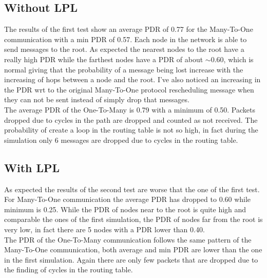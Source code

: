 \documentclass{article}
\begin{document}
\subsection{Without LPL}
The results of the first test show an average PDR of 0.77 for the Many-To-One communication with a min PDR of 0.57. Each node in the network is able to send messages to the root. As expected the nearest nodes to the root have a really high PDR while the farthest nodes have a PDR of about $\sim$0.60, which is normal giving that the probability of a message being lost increase with the increasing of hops between a node and the root. I've also noticed an increasing in the PDR wrt to the original Many-To-One protocol rescheduling message when they can not be sent instead of simply drop that messages.\\
The average PDR of the One-To-Many is 0.79 with a minimum of 0.50. Packets dropped due to cycles in the path are dropped and counted as not received. The probability of create a loop in the routing table is not so high, in fact during the simulation only 6 messages are dropped due to cycles in the routing table.\\
\subsection{With LPL}
As expected the results of the second test are worse that the one of the first test. For Many-To-One communication the average PDR has dropped to 0.60 while minimum is 0.25. While the PDR of nodes near to the root is quite high and comparable the ones of the first simulation, the PDR of nodes far from the root is very low, in fact there are 5 nodes with a PDR lower than 0.40. \\
The PDR of the One-To-Many communication follows the same pattern of the Many-To-One communication, both average and min PDR are lower than the one in the first simulation. Again there are only few packets that are dropped due to the finding of cycles in the routing table.\\
\end{document}

